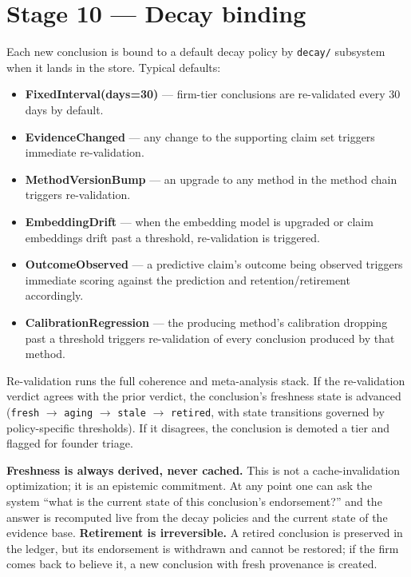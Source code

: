 \documentclass[11pt,letterpaper]{article}
\newcommand{\file}[1]{\texttt{#1}}
\begin{document}
\section{Stage 10 --- Decay binding}

Each new conclusion is bound to a default decay policy by \file{decay/} subsystem when it lands in the store. Typical defaults:

\begin{itemize}[leftmargin=1.5em,itemsep=0.1em]
\item \textbf{FixedInterval(days=30)} --- firm-tier conclusions are re-validated every 30 days by default.
\item \textbf{EvidenceChanged} --- any change to the supporting claim set triggers immediate re-validation.
\item \textbf{MethodVersionBump} --- an upgrade to any method in the method chain triggers re-validation.
\item \textbf{EmbeddingDrift} --- when the embedding model is upgraded or claim embeddings drift past a threshold, re-validation is triggered.
\item \textbf{OutcomeObserved} --- a predictive claim's outcome being observed triggers immediate scoring against the prediction and retention/retirement accordingly.
\item \textbf{CalibrationRegression} --- the producing method's calibration dropping past a threshold triggers re-validation of every conclusion produced by that method.
\end{itemize}

Re-validation runs the full coherence and meta-analysis stack. If the re-validation verdict agrees with the prior verdict, the conclusion's freshness state is advanced (\texttt{fresh} $\to$ \texttt{aging} $\to$ \texttt{stale} $\to$ \texttt{retired}, with state transitions governed by policy-specific thresholds). If it disagrees, the conclusion is demoted a tier and flagged for founder triage.

\textbf{Freshness is always derived, never cached.} This is not a cache-invalidation optimization; it is an epistemic commitment. At any point one can ask the system ``what is the current state of this conclusion's endorsement?'' and the answer is recomputed live from the decay policies and the current state of the evidence base. \textbf{Retirement is irreversible.} A retired conclusion is preserved in the ledger, but its endorsement is withdrawn and cannot be restored; if the firm comes back to believe it, a new conclusion with fresh provenance is created.
\end{document}

